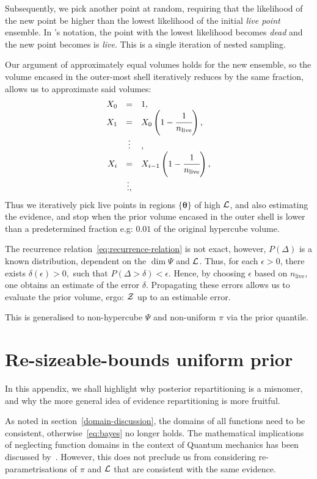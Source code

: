\documentclass[usenatbib]{mnras}
\begin{document}
Subsequently, we pick another point at random, requiring that the
likelihood of the new point be higher than the lowest likelihood of
the initial \emph{live point} ensemble. In \citeauthor{Skilling2006}'s
notation, the point with the lowest likelihood becomes \emph{dead} and
the new point becomes is \emph{live}. This is a single iteration of
nested sampling.

Our argument of approximately equal volumes holds for the new
ensemble, so the volume encased in the outer-most shell iteratively
reduces by the same fraction, allows us to approximate said volumes:
\begin{equation}\label{eq:recurrence-relation}
  \begin{array}{rcl}
  X_{0} &=  &1, \\
  X_{1} &= &X_{0} \left(1- \cfrac{1}{n_\text{live}}\right),\\
  & \vdots &, \\
  X_{i} &= &X_{i-1}\left(1- \cfrac{1}{n_\text{live}}\right),\\
  & \vdots, &
\end{array}
\end{equation}
Thus we iteratively pick live points in regions $\{\bm{\theta}\}$ of
high \({\cal L}\), and also estimating the evidence, and stop when the
prior volume encased in the outer shell is lower than a predetermined
fraction e.g: \(0.01\) of the original hypercube volume.

The recurrence relation~\eqref{eq:recurrence-relation} is not exact,
however, \(P(\Delta)\) is a known distribution, dependent on the
\(\dim \Psi\) and \({\cal L}\). Thus, for each \(\epsilon>0\), there
exists \(\delta(\epsilon) >0,\) such that
\(P(\Delta > \delta)<\epsilon.\) Hence, by choosing \(\epsilon\) based
on \(n_\text{live}\), one obtains an estimate of the error
\(\delta\). Propagating these errors allows us to evaluate the prior
volume, ergo: ${\cal Z}$ up to an estimable error.

This is generalised to non-hypercube $\Psi$ and non-uniform $\pi$ via
the prior quantile.

\section{Re-sizeable-bounds uniform prior}\label{sec:resizeable}
In this appendix, we shall highlight why posterior repartitioning is a
misnomer, and why the more general idea of evidence repartitioning is
more fruitful.

As noted in section~\vref{domain-discussion}, the domains of all
functions need to be consistent, otherwise~\vref{eq:bayes} no longer
holds. The mathematical implications of neglecting function domains in
the context of Quantum mechanics has been discussed
by~\cite{Gieres_2000}. However, this does not preclude us from
considering re-parametrisations of $\pi$ and ${\cal L}$ that are
consistent with the same evidence. 
\end{document}
